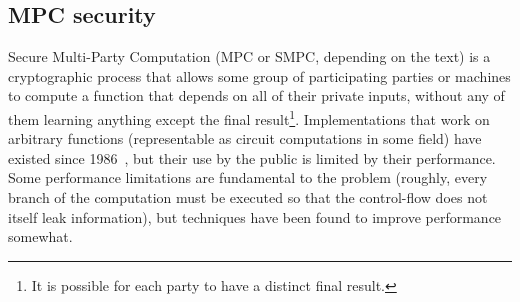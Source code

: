 \documentclass[acmlarge, manuscript, screen, review, anonymous, table]{acmart}
\begin{document}
\subsection{MPC security}

Secure Multi-Party Computation (MPC or SMPC, depending on the text)
is a cryptographic process that allows some group of participating parties or machines
to compute a function that depends on all of their private inputs,
without any of them learning anything except the final result\footnote{
    It is possible for each party to have a distinct final result.
}.
Implementations that work on arbitrary functions (representable as circuit computations in some field)
have existed since 1986~\cite{yao1986generate}, %
but their use by the public is limited by their performance.
Some performance limitations are fundamental to the problem
(roughly, every branch of the computation must be executed so that the control-flow does not itself leak information),
but techniques have been found to improve performance somewhat.
\end{document}
